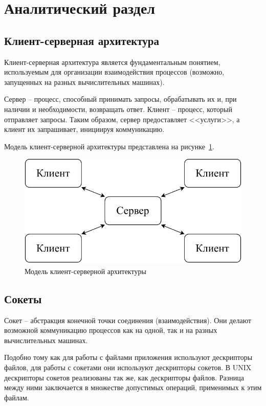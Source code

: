 \section{Аналитический раздел}

\subsection{Клиент-серверная архитектура}

Клиент-серверная архитектура является фундаментальным понятием, используемым для организации взаимодействия процессов (возможно, запущенных на разных вычислительных машинах).

Сервер -- процесс, способный принимать запросы, обрабатывать их и, при наличии и необходимости, возвращать ответ. Клиент -- процесс, который отправляет запросы. Таким образом, сервер предоставляет <<услуги>>, а клиент их запрашивает, инициируя коммуникацию.

Модель клиент-серверной архитектуры представлена на рисунке~\ref{client-server}.

\begin{figure}[ht]
	\centering
	\includegraphics[scale=0.8]{img/client-server.pdf}
	\caption{Модель клиент-серверной архитектуры}
	\label{client-server}
\end{figure}

\subsection{Сокеты}

Сокет -- абстракция конечной точки соединения (взаимодействия). Они делают возможной коммуникацию процессов как на одной, так и на разных вычислительных машинах.

Подобно тому как для работы с файлами приложения используют дескрипторы файлов, для работы с сокетами они используют дескрипторы сокетов. В UNIX дескрипторы сокетов реализованы так же, как дескрипторы файлов. Разница между ними заключается в множестве допустимых операций, применимых к этим файлам.

